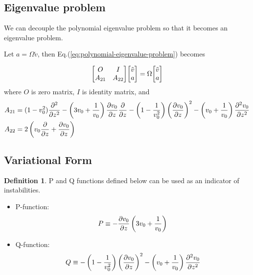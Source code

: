 \documentclass{article}
\theoremstyle{plain}
\theoremstyle{definition}
\newtheorem{definition}{Definition}
\theoremstyle{remark}
\theoremstyle{remark}
\begin{document}
\subsection{Eigenvalue problem}
We can decouple the polynomial eigenvalue problem so that it becomes an eigenvalue problem.

Let $a=\Omega\tilde{v}$, then Eq.(\ref{eq:polynomial-eigenvalue-problem}) becomes

\begin{equation}
    \mqty[ O & I\\A_{21} & A_{22} ]\mqty[ \tilde{v}\\ a] = \Omega\mqty[ \tilde{v}\\ a]
    \label{eq:eigenvalue-problem}
\end{equation}
where $O$ is zero matrix, $I$ is identity matrix, and
\begin{align*}
    A_{21} &= (1-v_0^2)\pdv[2]{}{z} 
    -\left(3v_0 + \frac{1}{v_0}\right)\pdv{v_0}{z}\pdv{}{z} 
    - \left(1-\frac{1}{v_0^2}\right)\left(\pdv{v_0}{z}\right)^2 
    - \left(v_0+\frac{1}{v_0}\right)\pdv[2]{v_0}{z} \\
    A_{22} &= 2\left(v_0\pdv{}{z} +\pdv{v_0}{z} \right) 
\end{align*}


\subsection{Variational Form}
\begin{definition}
    P and Q functions defined below can be used as an indicator of instabilities.
    \begin{itemize}
        \item P-function: 
        \begin{equation}
            P \equiv -\pdv{v_0}{z}\left(3v_0 + \frac{1}{v_0}\right)
            \label{eq:P-function}
        \end{equation}
        \item Q-function:
        \begin{equation}
            Q \equiv - \left(1-\frac{1}{v_0^2}\right)\left(\pdv{v_0}{z}\right)^2 
            - \left(v_0+\frac{1}{v_0}\right)\pdv[2]{v_0}{z}
            \label{eq:Q-function}
        \end{equation}
    \end{itemize}
\end{definition}
\end{document}
